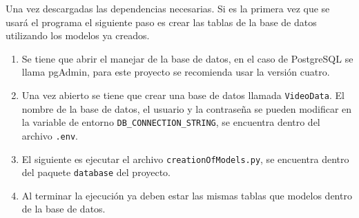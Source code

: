 \noindent Una vez descargadas las dependencias necesarias. Si es la primera vez que se usará el programa el siguiente paso es crear las tablas de la base de datos utilizando los modelos ya creados.
\begin{enumerate}
	\item Se tiene que abrir el manejar de la base de datos, en el caso de PostgreSQL se llama pgAdmin, para este proyecto se recomienda usar la versión cuatro.
	\item Una vez abierto se tiene que crear una base de datos llamada \texttt{VideoData}. El nombre de la base de datos, el usuario y la contraseña se pueden modificar en la variable de entorno \texttt{DB\_CONNECTION\_STRING}, se encuentra dentro del archivo \texttt{.env}.
	\item El siguiente es ejecutar el archivo \texttt{creationOfModels.py}, se encuentra dentro del paquete \texttt{database} del proyecto.
	\item Al terminar la ejecución ya deben estar las mismas tablas que modelos dentro de la base de datos.
\end{enumerate}

